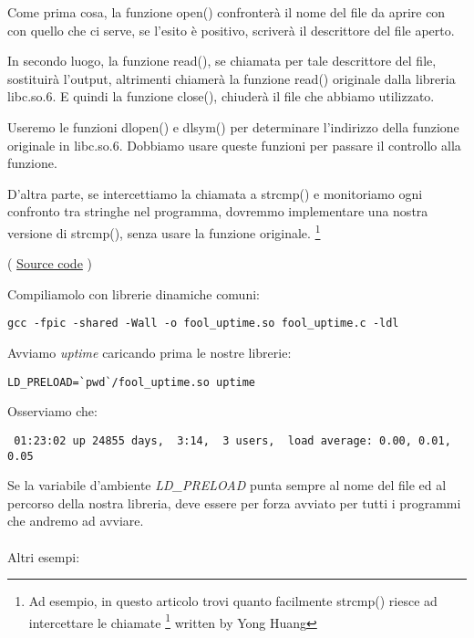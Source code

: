Come prima cosa, la funzione open() confronterà il nome del file da aprire con con quello che ci serve,
se l'esito è positivo, scriverà il descrittore del file aperto.

In secondo luogo, la funzione read(), se chiamata per tale descrittore del file, sostituirà l'output, altrimenti chiamerà 
la funzione read() originale dalla libreria libc.so.6.
E quindi la funzione close(), chiuderà il file che abbiamo utilizzato.


Useremo le funzioni dlopen() e dlsym() per determinare l'indirizzo della funzione originale in libc.so.6.
Dobbiamo usare queste funzioni per passare il controllo alla  funzione.


D'altra parte, se intercettiamo la chiamata a strcmp() e monitoriamo ogni confronto tra stringhe
nel programma, dovremmo implementare una nostra versione di strcmp(), senza usare la funzione originale.
\footnote{Ad esempio, in questo articolo trovi quanto facilmente strcmp() riesce ad intercettare le chiamate
\footnote{\href{http://go.yurichev.com/17143}{yurichev.com}}
written by Yong Huang}


( \href{\RepoURL/OS/LD_PRELOAD/fool_uptime.c}{Source code} )

Compiliamolo con librerie dinamiche comuni:

\begin{lstlisting}
gcc -fpic -shared -Wall -o fool_uptime.so fool_uptime.c -ldl
\end{lstlisting}

Avviamo \emph{uptime} caricando prima le nostre librerie:

\begin{lstlisting}
LD_PRELOAD=`pwd`/fool_uptime.so uptime
\end{lstlisting}

Osserviamo che:

\begin{lstlisting}
 01:23:02 up 24855 days,  3:14,  3 users,  load average: 0.00, 0.01, 0.05
\end{lstlisting}

Se la variabile d'ambiente \emph{LD\_PRELOAD} punta sempre al nome del file ed al percorso della nostra libreria, 
deve essere per forza avviato per tutti i programmi che andremo ad avviare. \\
\\
Altri esempi:

